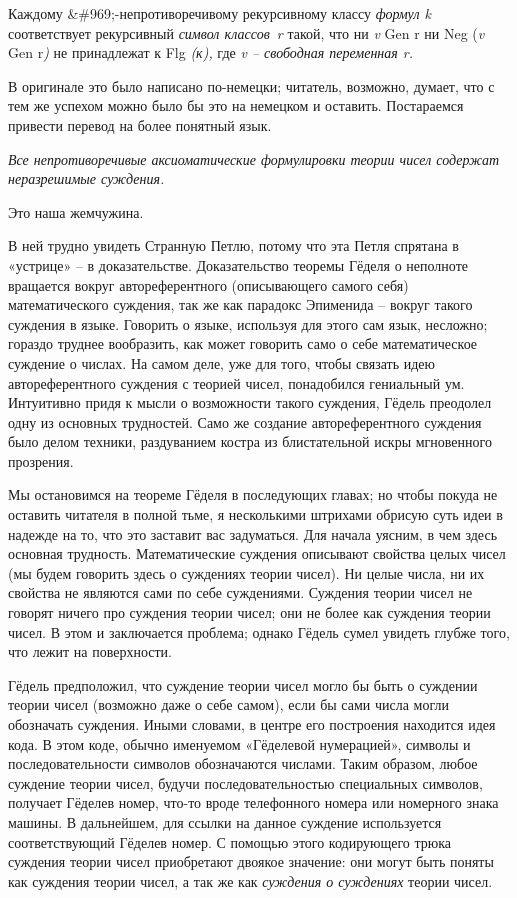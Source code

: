 \documentclass[../main.tex]{subfiles}
\begin{document}
Каждому \&\#969;-непротиворечивому рекурсивному классу \emph{формул k} соответствует рекурсивный \emph{символ классов~r} такой, что ни \emph{v} Gen r ни Neg (\emph{v} Gen r\emph{)} не принадлежат к Flg \emph{(к),} где \emph{v \--- свободная переменная r.}

В оригинале это было написано по-немецки; читатель, возможно, думает, что с тем же успехом можно было бы это на немецком и оставить. Постараемся привести перевод на более понятный язык.

\emph{Все непротиворечивые аксиоматические формулировки теории чисел содержат неразрешимые суждения.}

Это наша жемчужина.

В ней трудно увидеть Странную Петлю, потому что эта Петля спрятана в «устрице» \--- в доказательстве. Доказательство теоремы Гёделя о неполноте вращается вокруг автореферентного (описывающего самого себя) математического суждения, так же как парадокс Эпименида \--- вокруг такого суждения в языке. Говорить о языке, используя для этого сам язык, несложно; гораздо труднее вообразить, как может говорить само о себе математическое суждение о числах. На самом деле, уже для того, чтобы связать идею автореферентного суждения с теорией чисел, понадобился гениальный ум. Интуитивно придя к мысли о возможности такого суждения, Гёдель преодолел одну из основных трудностей. Само же создание автореферентного суждения было делом техники, раздуванием костра из блистательной искры мгновенного прозрения.

Мы остановимся на теореме Гёделя в последующих главах; но чтобы покуда не оставить читателя в полной тьме, я несколькими штрихами обрисую суть идеи в надежде на то, что это заставит вас задуматься. Для начала уясним, в чем здесь основная трудность. Математические суждения описывают свойства целых чисел (мы будем говорить здесь о суждениях теории чисел). Ни целые числа, ни их свойства не являются сами по себе суждениями. Суждения теории чисел не говорят ничего про суждения теории чисел; они не более как суждения теории чисел. В этом и заключается проблема; однако Гёдель сумел увидеть глубже того, что лежит на поверхности.

Гёдель предположил, что суждение теории чисел могло бы быть о суждении теории чисел (возможно даже о себе самом), если бы сами числа могли обозначать суждения. Иными словами, в центре его построения находится идея кода. В этом коде, обычно именуемом «Гёделевой нумерацией», символы и последовательности символов обозначаются числами. Таким образом, любое суждение теории чисел, будучи последовательностью специальных символов, получает Гёделев номер, что-то вроде телефонного номера или номерного знака машины. В дальнейшем, для ссылки на данное суждение используется соответствующий Гёделев номер. С помощью этого кодирующего трюка суждения теории чисел приобретают двоякое значение: они могут быть поняты как суждения теории чисел, а так же как \emph{суждения о суждениях} теории чисел.
\end{document}
